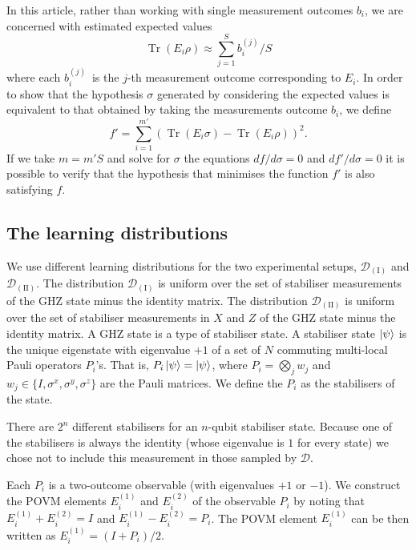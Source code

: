 \documentclass[aps,superscriptaddress,nofootinbib,twocolumn]{revtex4-1}
\begin{document}
In this article, rather than working with single measurement outcomes $b_i$, we are concerned with estimated expected values  
$$\operatorname*{Tr}\left(E_i \rho \right) \approx \sum_{j=1} ^S b_i ^{(j)}  / S $$
where each $b_{i} ^{(j)}$\ is the $j$-th measurement outcome corresponding to $E_i$. In order to show that the hypothesis $\sigma$ generated by considering the expected values is equivalent to that obtained by taking the measurements outcome $b_i$, we define 
$$f' = \sum_{i=1}^{m'}\left(  \operatorname*{Tr}\left(  E_{i}\sigma\right) - \operatorname*{Tr}\left(E_i \rho \right) \right)  ^{2}.
$$ 
If we take $m = m'S$ and solve for $\sigma$ the equations $df/d\sigma = 0$ and $df'/d\sigma = 0$  it is possible to verify that the hypothesis that minimises the function $f'$ is also satisfying $f$. 

\subsection*{The learning distributions}

We use different learning distributions for the two experimental setups, $\mathcal{D}_{(\mathrm{I})}$ and $\mathcal{D}_{(\mathrm{II})}$. The distribution $\mathcal{D}_{(\mathrm{I})}$ is uniform over the set of stabiliser measurements~\cite{gottesman1996stabilisers} of the GHZ state minus the identity matrix. The distribution $\mathcal{D}_{(\mathrm{II})}$ is uniform over the set of stabiliser measurements in $X$ and $Z$ of the GHZ state minus the identity matrix. A GHZ state \cite{greenberger1989going} is a type of stabiliser state. A stabiliser state $\ket{\psi}$ is the unique eigenstate with eigenvalue $+1$ of a set of $N$ commuting multi-local Pauli operators $P_i$'s. That is, $
P_i \ket{\psi} = \ket{\psi}
$, where $P_i = \bigotimes _j w_j$ and $w_j \in \{I,\sigma^x,\sigma^y,\sigma^z\}$ are the Pauli matrices. We define the $P_i$ as the stabilisers of the state.

There are $2^n$ different stabilisers for an $n$-qubit stabiliser state. Because one of the stabilisers is always the identity (whose eigenvalue is $1$ for every state) we chose not to include this measurement in those sampled by $\mathcal{D}$.

Each $P_i$ is a two-outcome observable (with eigenvalues $+1$ or $-1$). We construct the POVM elements $E_i ^{(1)}$ and $E_i ^{(2)}$ of the observable $P_i$ by noting that $ E_i ^{(1)} + E_i ^{(2)} = I$ and $ E_i ^{(1)} - E_i ^{(2)}= P_i$. The POVM element $E_i ^{(1)}$ can be then written as $  E_i ^{(1)} = (I + P_i)/2$.
\end{document}
